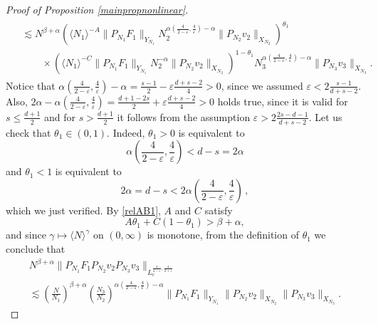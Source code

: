 \documentclass[10pt,leqno]{amsart}
\numberwithin{equation}{section}
\begin{document}
\begin{proof}[Proof of Proposition \ref{mainpropnonlinear}]
\begin{multline*}
\begin{aligned}
&\lesssim  N^{\beta +\alpha} (\langle N_1\rangle^{-A} \|P_{N_1} F_1\|_{Y_{N_1}} N_2^{ \alpha (\frac{4}{2-\varepsilon} ,\frac{4}{\varepsilon}) - \alpha } \|P_{N_2}v_2\|_{X_{N_2}} )^{\theta_1} \\
&\qquad \times  (\langle N_1 \rangle^{-C}\|P_{N_1} F_1\|_{Y_{N_1}} N_2^{-\alpha} \|P_{N_2} v_2 \|_{X_{N_2}} )^{1-\theta_1}  N_3^{\alpha (\frac{4}{2-\varepsilon} ,\frac{4}{\varepsilon}) -\alpha}\|P_{N_3} v_3\|_{X_{N_3}}.
\end{aligned}
\end{multline*}
Notice that $\alpha (\frac{4}{2-\varepsilon} ,\frac{4}{\varepsilon}) - \alpha= \frac{s-1}{2}-\varepsilon \frac{d+s-2}{4}>0 $, since we assumed 
$\varepsilon < 2\frac{s-1}{d+s-2}$. 
Also, $2\alpha - \alpha (\frac{4}{2-\varepsilon} ,\frac{4}{\varepsilon})= \frac{d+1-2s}{2}+ \varepsilon \frac{d+s-2}{4}>0$ holds true, since it is valid for $s\leq \frac{d+1}{2}$ 
and for $s> \frac{d+1}{2}$ it follows from the assumption $\varepsilon > 2\frac{2s-d-1}{d+s-2}$. 
Let us check that $\theta_1 \in (0, 1)$. Indeed, $\theta_1 > 0$ is equivalent to 
$$
\alpha \left(\frac{4}{2-\varepsilon} ,\frac{4}{\varepsilon}\right) < d - s = 2 \alpha
$$
and $\theta_1 < 1$ is equivalent to 
$$
2\alpha = d - s < 2 \alpha \left(\frac{4}{2-\varepsilon} ,\frac{4}{\varepsilon}\right) \,,
$$
which we just verified. 
By \eqref{relAB1}, $A$ and $C$ satisfy
$$A\theta_1 +C (1-\theta_1)>\beta +\alpha,$$
and since $\gamma \mapsto \langle N \rangle^\gamma$ on $(0, \infty)$ is monotone, from the definition of $\theta_1$ we conclude that
\begin{multline*}
N^{\beta +\alpha}  \|P_{N_1}F_1 P_{N_2} v_2 P_{N_3} v_3\|_{L^{\frac{4}{4-\varepsilon} ,\frac{4}{2+\varepsilon}}_e} \\
\lesssim \left(\frac{N}{N_1}\right)^{\beta +\alpha} \left(\frac{N_3} {N_2}\right)^{\alpha (\frac{4}{2-\varepsilon} ,\frac{4}{\varepsilon}) -\alpha}   \|P_{N_1}F_1\|_{Y_{N_1}}  \|P_{N_2}v_2\|_{X_{N_2}}   
\|P_{N_3}v_3\|_{X_{N_3}} .
\end{multline*}


\end{proof}
\end{document}
